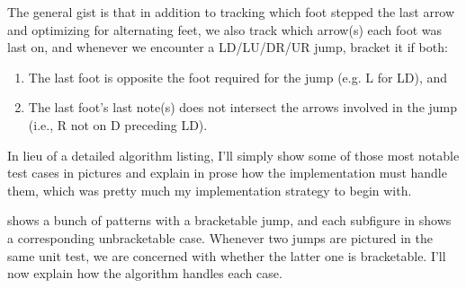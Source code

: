 \documentclass[10pt]{sigplanconf}
\begin{document}
The general gist is that in addition to tracking which foot stepped the last arrow and optimizing for alternating feet,
we also track which arrow(s) each foot was last on,
and whenever we encounter a LD/LU/DR/UR jump, bracket it if both:
\begin{enumerate}
	\item The last foot is opposite the foot required for the jump (e.g. L for LD), and
	\item The last foot's last note(s) does not intersect the arrows involved in the jump (i.e., R not on D preceding LD).
\end{enumerate}
In lieu of a detailed algorithm listing, I'll simply show some of those most notable test cases in pictures and explain in prose how the implementation must handle them,
which was pretty much my implementation strategy to begin with.

 shows a bunch of patterns with a bracketable jump,
and each subfigure in  shows a corresponding unbracketable case.
Whenever two jumps are pictured in the same unit test, we are concerned with whether the latter one is bracketable.
I'll now explain how the algorithm handles each case.
\end{document}
